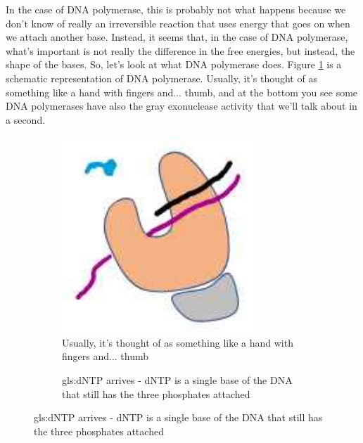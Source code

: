 \documentclass[]{article}
\begin{document}
In the case of DNA polymerase, this is probably not what happens because we don't know of
really an irreversible reaction that uses energy that goes on when we attach another base.
Instead, it seems that, in the case of DNA polymerase, what's important is not really the difference in the free energies, but instead, the shape of the bases.
So, let's look at what DNA polymerase does. 
Figure \ref{fig:WhatDNApolymeraseDoes0} is a schematic representation of DNA polymerase. Usually, it's thought of as something like a hand with fingers and... thumb, and at the bottom you see some DNA polymerases have also the gray exonuclease activity that we'll talk about in a second.

\begin{figure}[H]
	\caption{Schematic representation of DNA polymerase}
	\begin{subfigure}[t]{0.45\textwidth}
		\caption{Usually, it's thought of as something like a hand with fingers and... thumb}\label{fig:WhatDNApolymeraseDoes0}
		\includegraphics[width=0.8\textwidth]{WhatDNApolymeraseDoes0}
	\end{subfigure}
	\begin{subfigure}[t]{0.45\textwidth}
		\caption{\gls{gls:dNTP} arrives - dNTP is a single base of the DNA that still has the three phosphates attached}\label{fig:WhatDNApolymeraseDoes1}

\end{subfigure}
\end{figure}
\end{document}
